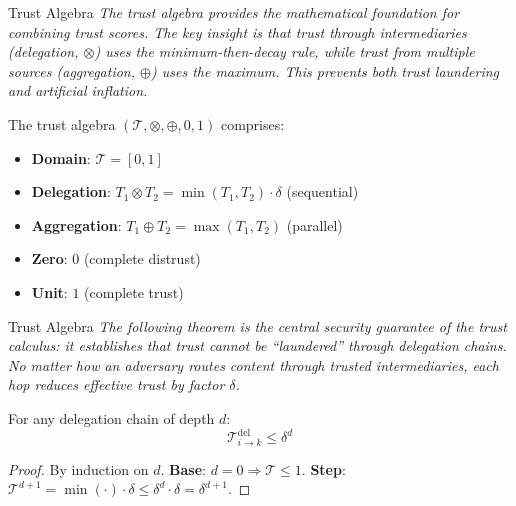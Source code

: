 \documentclass[
  ignorenonframetext,
]{beamer}
\begin{document}
\begin{frame}[allowframebreaks]{Trust Algebra}
\protect{}\label{trust-algebra}
\emph{The trust algebra provides the mathematical foundation for
combining trust scores. The key insight is that trust through
intermediaries (delegation, \(\otimes\)) uses the minimum-then-decay
rule, while trust from multiple sources (aggregation, \(\oplus\)) uses
the maximum. This prevents both trust laundering and artificial
inflation.}

\begin{definition}
\label{def:trust-algebra}
The trust algebra $(\mathcal{T}, \otimes, \oplus, 0, 1)$ comprises:
\begin{itemize}
\item \textbf{Domain}: $\mathcal{T} = [0, 1]$
\item \textbf{Delegation}: $T_1 \otimes T_2 = \min(T_1, T_2) \cdot \delta$ (sequential)
\item \textbf{Aggregation}: $T_1 \oplus T_2 = \max(T_1, T_2)$ (parallel)
\item \textbf{Zero}: $0$ (complete distrust)
\item \textbf{Unit}: $1$ (complete trust)
\end{itemize}
\end{definition}

\end{frame}

\begin{frame}[allowframebreaks]{Trust Algebra}
\emph{The following theorem is the central security guarantee of the
trust calculus: it establishes that trust cannot be ``laundered''
through delegation chains. No matter how an adversary routes content
through trusted intermediaries, each hop reduces effective trust by
factor \(\delta\).}

\begin{theorem}
\label{thm:trust-bounded}
For any delegation chain of depth $d$:
\begin{equation}
\label{eq:trust-bound}
\mathcal{T}_{i \to k}^{\text{del}} \leq \delta^d
\end{equation}
\end{theorem}

\begin{proof}
By induction on $d$. \textbf{Base}: $d=0 \Rightarrow \mathcal{T} \leq 1$. \textbf{Step}: $\mathcal{T}^{d+1} = \min(\cdot) \cdot \delta \leq \delta^d \cdot \delta = \delta^{d+1}$.
\end{proof}

\end{frame}
\end{document}
